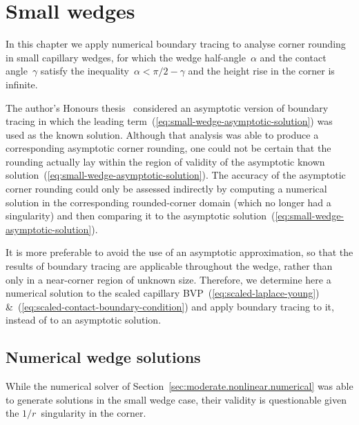 \chapter{Small wedges}
\label{ch:small}

In this chapter
we apply numerical boundary tracing to analyse corner rounding
in small capillary wedges,
for which the wedge half-angle~$\alpha$ and the contact angle~$\gamma$
satisfy the inequality~$\alpha < \pi/2 - \gamma$
and the height rise in the corner is infinite.

The author's Honours thesis~%
  \cite{li-2017-thesis-rounding-capillary-wedge}
considered an asymptotic version of boundary tracing
in which the leading term~(\ref{eq:small-wedge-asymptotic-solution})
was used as the known solution.
Although that analysis was able to produce
a corresponding asymptotic corner rounding,
one could not be certain that the rounding actually lay
within the region of validity
of the asymptotic known solution~(\ref{eq:small-wedge-asymptotic-solution}).
The accuracy of the asymptotic corner rounding
could only be assessed indirectly
by computing a numerical solution in the corresponding rounded-corner domain
(which no longer had a singularity)
and then comparing it
to the asymptotic solution~(\ref{eq:small-wedge-asymptotic-solution}).

It is more preferable to avoid the use of an asymptotic approximation,
so that the results of boundary tracing are applicable throughout the wedge,
rather than only in a near-corner region of unknown size.
Therefore, we determine here a numerical solution
to the scaled capillary BVP~(\ref{eq:scaled-laplace-young})
\&~(\ref{eq:scaled-contact-boundary-condition})
and apply boundary tracing to it,
instead of to an asymptotic solution.

\section{Numerical wedge solutions}
\label{sec:small.numerical}

While the numerical solver of Section~\ref{sec:moderate.nonlinear.numerical}
was able to generate solutions in the small wedge case,
their validity is questionable
given the $1/r$~singularity in the corner.

